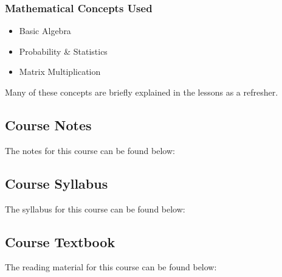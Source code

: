 {\begin{highlight}[\CSPBCogSci]
        \subsubsection*{Mathematical Concepts Used}
        
        \begin{itemize}
            \item Basic Algebra
            \item Probability \& Statistics
            \item Matrix Multiplication
        \end{itemize}
        Many of these concepts are briefly explained in the lessons as a refresher.
    \end{highlight}
}

\subsection{Course Notes}

The notes for this course can be found below: 

\subsection{Course Syllabus}

The syllabus for this course can be found below: 

\subsection{Course Textbook}

The reading material for this course can be found below:

